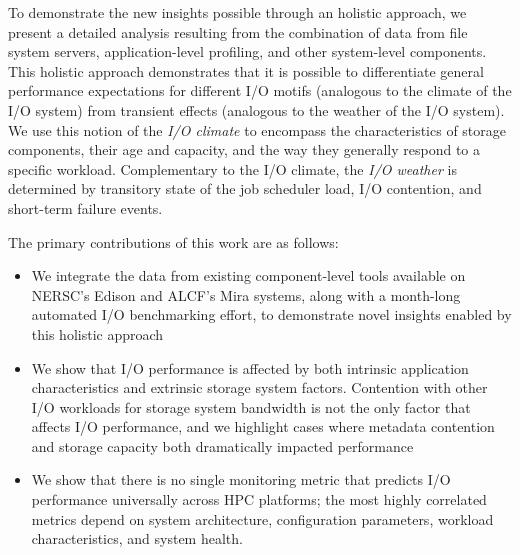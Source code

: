 To demonstrate the new insights possible through an holistic approach, we present a detailed analysis resulting from the combination of data from file system servers, application-level profiling, and other system-level components.
This holistic approach demonstrates that it is possible to differentiate general performance expectations for different I/O motifs (analogous to the climate of the I/O system) from transient effects (analogous to the weather of the I/O system).
We use this notion of the \emph{I/O climate} to encompass the characteristics of storage components, their age and capacity, and the way they generally respond to a specific workload.
Complementary to the I/O climate, the \emph{I/O weather} is determined by transitory state of the job scheduler load, I/O contention, and short-term failure events.


The primary contributions of this work are as follows:
\begin{itemize}[leftmargin=*]
\item We integrate the data from existing component-level tools available on NERSC's Edison and ALCF's Mira systems, along with a month-long automated I/O benchmarking effort, to demonstrate novel insights enabled by this holistic approach
\item We show that I/O performance is affected by both intrinsic application characteristics and extrinsic storage system factors.
Contention with other I/O workloads for storage system bandwidth is not the only factor that affects I/O performance, and
we highlight cases where metadata contention and storage capacity both dramatically impacted performance
\item We show that there is no single monitoring metric that predicts I/O performance
universally across HPC platforms; the most highly correlated metrics depend on system architecture, configuration parameters, workload characteristics, and system health.
\end{itemize}
